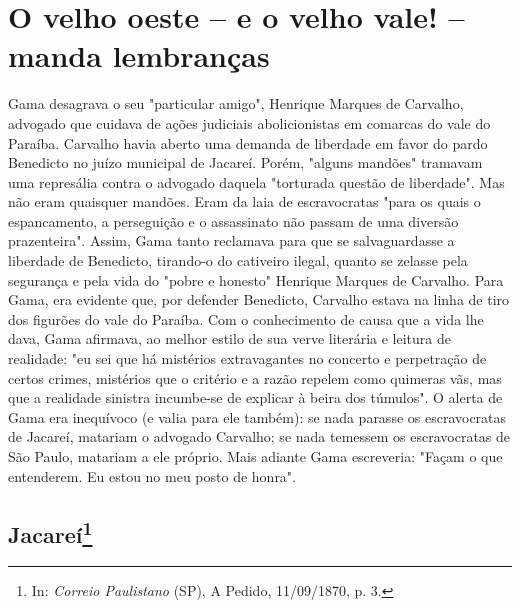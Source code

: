 \part{O velho oeste -- e o velho vale! -- manda lembranças}


\pagebreak
\mbox{}\vfill
\thispagestyle{empty}

{\small\noindent
Gama desagrava o seu "particular amigo", Henrique Marques de
Carvalho, advogado que cuidava de ações judiciais abolicionistas em
comarcas do vale do Paraíba. Carvalho havia aberto uma demanda de
liberdade em favor do pardo Benedicto no juízo municipal de Jacareí.
Porém, "alguns mandões" tramavam uma represália contra o advogado
daquela "torturada questão de liberdade". Mas não eram quaisquer
mandões. Eram da laia de escravocratas "para os quais o espancamento, a
perseguição e o assassinato não passam de uma diversão prazenteira".
Assim, Gama tanto reclamava para que se salvaguardasse a liberdade de
Benedicto, tirando-o do cativeiro ilegal, quanto se zelasse pela
segurança e pela vida do "pobre e honesto" Henrique Marques de Carvalho.
Para Gama, era evidente que, por defender Benedicto, Carvalho estava na
linha de tiro dos figurões do vale do Paraíba. Com o conhecimento de
causa que a vida lhe dava, Gama afirmava, ao melhor estilo de sua verve
literária e leitura de realidade: "eu sei que há mistérios extravagantes
no concerto e perpetração de certos crimes, mistérios que o critério e a
razão repelem como quimeras vãs, mas que a realidade sinistra incumbe-se
de explicar à beira dos túmulos". O alerta de Gama era inequívoco (e
valia para ele também): se nada parasse os escravocratas de Jacareí,
matariam o advogado Carvalho; se nada temessem os escravocratas de São
Paulo, matariam a ele próprio. Mais adiante Gama escreveria: "Façam o
que entenderem. Eu estou no meu posto de honra".}

\chapter{Jacareí\footnote[*]{In: \emph{Correio Paulistano} (SP), A
  Pedido, 11/09/1870, p. 3.}}


